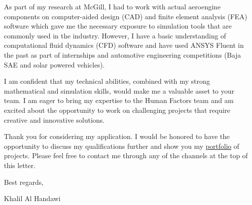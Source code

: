 \documentclass[12pt]{article} %
\begin{document}
\medskip %

As part of my research at McGill, I had to work with actual aeroengine components on computer-aided design (CAD) and finite element analysis (FEA) software which gave me the necessary exposure to simulation tools that are commonly used in the industry. However, I have a basic understanding of computational fluid dynamics (CFD) software and have used ANSYS Fluent in the past as part of internships and automotive engineering competitions (Baja SAE and solar powered vehicles).

\medskip %

I am confident that my technical abilities, combined with my strong mathematical and simulation skills, would make me a valuable asset to your team. I am eager to bring my expertise to the Human Factors team and am excited about the opportunity to work on challenging projects that require creative and innovative solutions.

\medskip %

Thank you for considering my application. I would be honored to have the opportunity to discuss my qualifications further and show you my \href{https://khbalhandawi.github.io/projects/}{portfolio} of projects. Please feel free to contact me through any of the channels at the top of this letter.

\medskip %

Best regards,

\medskip %


Khalil Al Handawi


\medskip %

\end{document}

